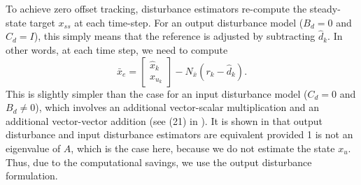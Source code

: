 \documentclass[twocolumn,twoside]{IEEEtran}
\newcommand{\x}{\ensuremath{x }\xspace}
\begin{document}
To achieve zero offset tracking, disturbance estimators re-compute the steady-state target $\x_{ss}$ at each time-step. For an output disturbance model ($B_d=0$ and $C_d=I$), this simply means that the reference is adjusted by subtracting $\hat d_k$. In other words, at each time step, we need to compute
\begin{equation}
  \bar{x}_{e} =
  \begin{bmatrix}\hat{x}_k\\x_{u_k}
  \end{bmatrix}
  - N_{\bar{x}}(r_k - \hat{d}_k).
\end{equation}
This is slightly simpler than the case for an input disturbance model ($C_d=0$ and $B_d\neq0$), which involves an additional vector-scalar multiplication and an additional vector-vector addition (see (21) in \cite{maeder_offset-free_2007}). It is shown in \cite{maeder_offset-free_2007} that output disturbance and input disturbance estimators are equivalent provided 1 is not an eigenvalue of $A$, which is the case here, because we do not estimate the state $x_u$. Thus, due to the computational savings, we use the output disturbance formulation. 
\end{document}
